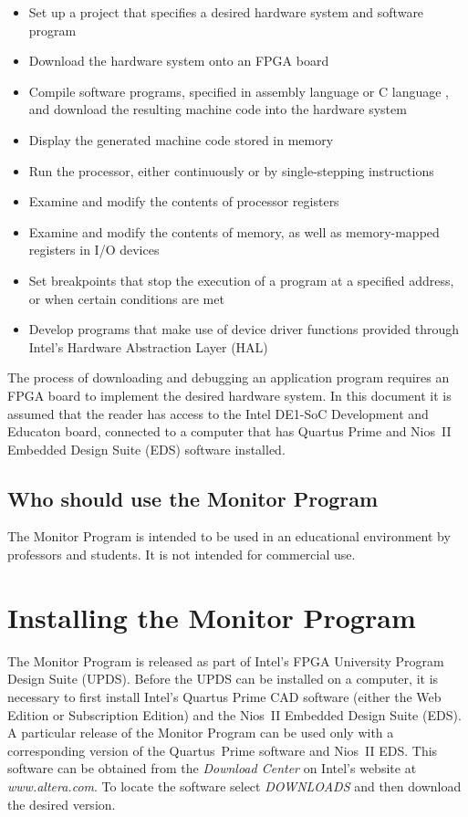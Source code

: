 \documentclass[11pt, twoside, pdftex]{article}
\begin{document}
\begin{itemize}
    \item Set up a project that specifies a desired
hardware system and software program
    \item Download the hardware system onto an FPGA board
    \item Compile software programs, specified in assembly language or C language , and download the resulting machine code
into the hardware system
    \item Display the generated machine code stored in memory
    \item Run the processor, either continuously or by single-stepping instructions
    \item Examine and modify the contents of processor registers
    \item Examine and modify the contents of memory, as well as
memory-mapped registers in I/O devices
    \item Set breakpoints that stop the execution of a program at
a specified address, or when certain conditions are met
    \item Develop programs that make use of device driver functions provided through Intel's Hardware Abstraction Layer
(HAL)
\end{itemize}

The process of downloading and debugging an application program
requires an FPGA board to implement the desired hardware system.
In this document it is assumed that the reader has access to the
Intel DE1-SoC Development and Educaton board, connected to a
computer that has Quartus Prime 
and Nios~II Embedded Design Suite (EDS) software installed. 

\subsection{Who should use the Monitor Program}

The Monitor Program is intended to be used in an educational
environment by professors and students. It is not intended for
commercial use.

\section{Installing the Monitor Program}

The Monitor Program is released as part of Intel's FPGA University
Program Design Suite (UPDS). Before the UPDS can be installed on
a computer, it is necessary to first install Intel's Quartus Prime
CAD software (either the Web Edition or Subscription Edition) 
and the Nios~II Embedded Design Suite (EDS). A particular release
of the Monitor Program can be used only with a corresponding version of the Quartus~Prime software and Nios~II EDS. This software
can be obtained from the {\it Download Center} on Intel's
website at {\it www.altera.com}.
To locate the software select {\it DOWNLOADS} and then download
the desired version.
\end{document}
